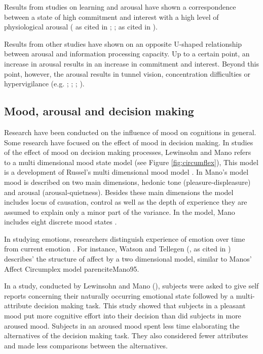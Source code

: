 \documentclass[jou,11pt]{apa6}
\begin{document}
Results from studies on learning and arousal have shown a
correspondence between a state of high commitment and interest with a
high level of physiological arousal (\cite{Berlyne60} as cited in
\cite{Izard77}; \cite{Berlyne67}; as cited in \cite{Izard77}).

Results from other studies have shown on an opposite U-shaped
relationship between arousal and information processing capacity.  Up
to a certain point, an increase in arousal results in an increase in
commitment and interest.  Beyond this point, however, the arousal
results in tunnel vision, concentration difficulties or hypervigilance
(e.g. \cite{Easterbrook59}; \cite{JanisMann77}; \cite{LewinsohnMano93};
\cite{StoneKadous94}).



\subsection{Mood, arousal and decision making}

Research have been conducted on the influence of mood on cognitions in
general.  Some research have focused on the effect of mood in decision
making.  In studies of the effect of mood on decision making
processes, Lewinsohn and Mano refers to a multi dimensional mood state
model \parencite{LewinsohnMano93, Mano94} (see Figure
\ref{fig:circumflex}), This model
is a development of Russel's multi dimensional mood model
\parencite{Russel78}. In Mano's model mood is described on two main dimensions,
hedonic tone (pleasure-displeasure) and arousal (arousal-quietness).
Besides these main dimensions the model includes locus of causation,
control as well as the depth of experience they are assumed to explain
only a minor part of the variance.  In the model, Mano includes eight
discrete mood states \parencite{Mano94}.







In studying emotions, researchers distinguish experience of emotion
over time from current emotion \parencite{FiskeTaylor91}. For instance,
Watson and Tellegen (\cite{WatsonTellegen85}, as cited in \cite{FiskeTaylor91})
describes' the structure of affect by a two dimensional model, similar
to Manos' Affect Circumplex model parencite{Mano95}.

In a study, conducted by Lewinsohn and Mano
(\citeyear{LewinsohnMano93}), subjects were asked to give self reports
concerning their naturally occurring emotional state followed by a
multi-attribute decision making task. This study showed that subjects
in a pleasant mood put more cognitive effort into their decision than
did subjects in more aroused mood. Subjects in an aroused mood spent
less time elaborating the alternatives of the decision making task.
They also considered fewer attributes and made less comparisons
between the alternatives.
\end{document}
